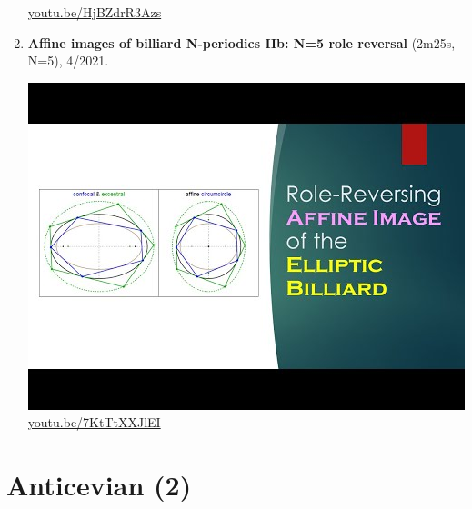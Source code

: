 \documentclass[12pt]{amsart}
\begin{document}
\begin{enumerate}[resume]
\begin{center}
\href{https://youtu.be/HjBZdrR3Azs}{\url{youtu.be/HjBZdrR3Azs}}\end{center}
% 
\item \textbf{Affine images of billiard N-periodics IIb: N=5 role reversal} (2m25s, N=5), 4/2021. 
\begin{center}\includegraphics[width=.5\textwidth]{pics/7KtTtXXJlEI.jpg} \\ 
\href{https://youtu.be/7KtTtXXJlEI}{\url{youtu.be/7KtTtXXJlEI}}\end{center}
% 
\end{enumerate}

\section{Anticevian (2)}
\end{document}
